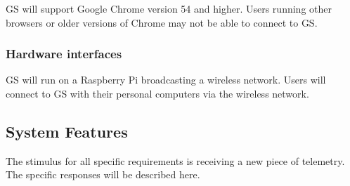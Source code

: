 \documentclass[10pt,journal,draftclsnofoot,onecolumn]{IEEEtran}
\begin{document}
	GS will support Google Chrome version 54 and higher. Users running other browsers or older versions of Chrome
	may not be able to connect to GS.
	\subsubsection{Hardware interfaces}
	GS will run on a Raspberry Pi broadcasting a wireless network. Users will connect to GS with their personal computers
	via the wireless network.
	
	\subsection{System Features}
	
	The stimulus for all specific requirements is receiving a new piece of telemetry. The specific responses will be described here.


		
\end{document}
